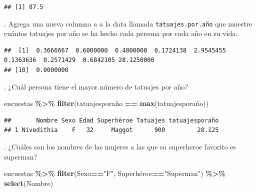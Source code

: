 \documentclass[
]{book}
\newenvironment{Shaded}{\begin{snugshade}}{\end{snugshade}}
\newcommand{\FunctionTok}[1]{\textcolor[rgb]{0.13,0.29,0.53}{\textbf{#1}}}
\newcommand{\NormalTok}[1]{#1}
\newcommand{\OtherTok}[1]{\textcolor[rgb]{0.56,0.35,0.01}{#1}}
\newcommand{\SpecialCharTok}[1]{\textcolor[rgb]{0.81,0.36,0.00}{\textbf{#1}}}
\newcommand{\StringTok}[1]{\textcolor[rgb]{0.31,0.60,0.02}{#1}}
\begin{document}
\begin{verbatim}
## [1] 87.5
\end{verbatim}

\hfill{}.
Agrega una nueva columna a a la data llamada \texttt{tatuajes.por.año} que muestre cuántos tatuajes por año se ha hecho cada persona por cada año en su vida.\\

\begin{Shaded}
\end{Shaded}

\begin{verbatim}
##  [1]  0.3666667  0.6000000  0.4800000  0.1724138  2.9545455  0.1363636  0.2571429  0.6842105 28.1250000
## [10]  0.0000000
\end{verbatim}

\hfill{}.
¿Cuál persona tiene el mayor número de tatuajes por año?\\

\begin{Shaded}
\begin{Highlighting}[]
\NormalTok{encuestas  }\SpecialCharTok{\%\textgreater{}\%} \FunctionTok{filter}\NormalTok{(tatuajesporaño }\SpecialCharTok{==} \FunctionTok{max}\NormalTok{(tatuajesporaño)) }
\end{Highlighting}
\end{Shaded}

\begin{verbatim}
##       Nombre Sexo Edad Superhéroe Tatuajes tatuajesporaño
## 1 Nivedithia    F   32     Maggot      900         28.125
\end{verbatim}

\hfill{}.
¿Cuáles son los nombres de las mujeres a las que su superheroe favorito es superman?\\

\begin{Shaded}
\begin{Highlighting}[]
\NormalTok{encuestas }\SpecialCharTok{\%\textgreater{}\%} \FunctionTok{filter}\NormalTok{(Sexo}\SpecialCharTok{==}\StringTok{"F"}\NormalTok{, Superhéroe}\SpecialCharTok{==}\StringTok{"Superman"}\NormalTok{) }\SpecialCharTok{\%\textgreater{}\%} \FunctionTok{select}\NormalTok{(Nombre)}
\end{Highlighting}
\end{Shaded}
\end{document}
